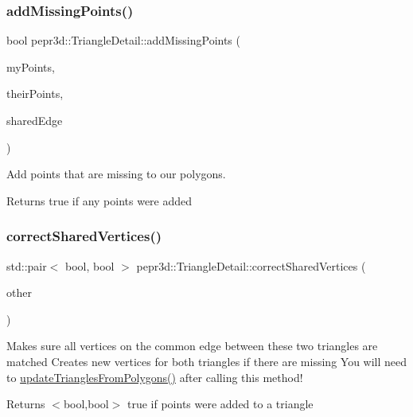 \subsubsection{\texorpdfstring{addMissingPoints()}{addMissingPoints()}}
{\footnotesize\ttfamily bool pepr3d\+::\+Triangle\+Detail\+::add\+Missing\+Points (\begin{DoxyParamCaption}\item[{const std\+::set$<$ Point3 $>$ \&}]{my\+Points,  }\item[{const std\+::set$<$ Point3 $>$ \&}]{their\+Points,  }\item[{const Segment3 \&}]{shared\+Edge }\end{DoxyParamCaption})\hspace{0.3cm}{\ttfamily [private]}}



Add points that are missing to our polygons. 

\begin{DoxyReturn}{Returns}
true if any points were added 
\end{DoxyReturn}
\mbox{\label{classpepr3d_1_1_triangle_detail_a30215d8b668385e1f6c145545d9366f2}} 
\subsubsection{\texorpdfstring{correctSharedVertices()}{correctSharedVertices()}}
{\footnotesize\ttfamily std\+::pair$<$ bool, bool $>$ pepr3d\+::\+Triangle\+Detail\+::correct\+Shared\+Vertices (\begin{DoxyParamCaption}\item[{\mbox{\hyperlink{classpepr3d_1_1_triangle_detail}{Triangle\+Detail}} \&}]{other }\end{DoxyParamCaption})}



Makes sure all vertices on the common edge between these two triangles are matched Creates new vertices for both triangles if there are missing You will need to \mbox{\hyperlink{classpepr3d_1_1_triangle_detail_a55836364f8bca5dce29da4a7320adf65}{update\+Triangles\+From\+Polygons()}} after calling this method! 

\begin{DoxyReturn}{Returns}
$<$bool,bool$>$ true if points were added to a triangle 
\end{DoxyReturn}
\mbox{\label{classpepr3d_1_1_triangle_detail_a0b2324c84ed90dc0e4ad7d14cdd5aa75}} 
